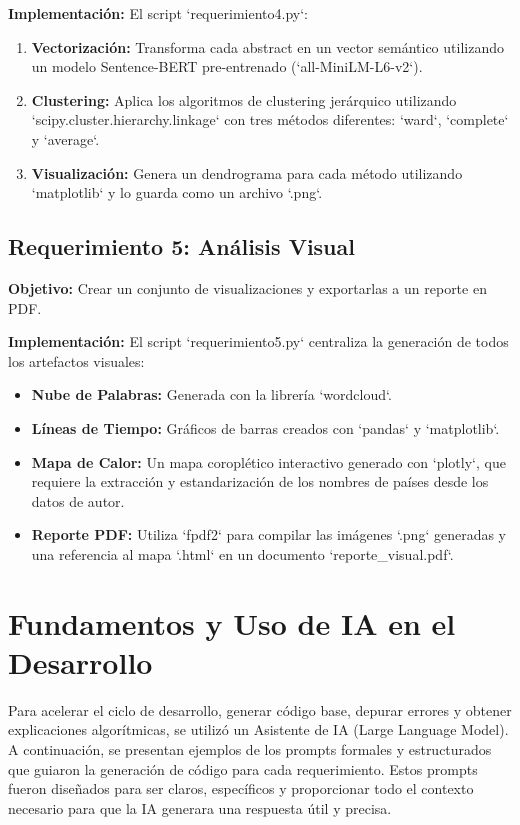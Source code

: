 \documentclass[12pt, a4paper]{article}
\begin{document}
\textbf{Implementación:} El script `requerimiento4.py`:
\begin{enumerate}
    \item \textbf{Vectorización:} Transforma cada abstract en un vector semántico utilizando un modelo Sentence-BERT pre-entrenado (`all-MiniLM-L6-v2`).
    \item \textbf{Clustering:} Aplica los algoritmos de clustering jerárquico utilizando `scipy.cluster.hierarchy.linkage` con tres métodos diferentes: `ward`, `complete` y `average`.
    \item \textbf{Visualización:} Genera un dendrograma para cada método utilizando `matplotlib` y lo guarda como un archivo `.png`.
\end{enumerate}

\subsection{Requerimiento 5: Análisis Visual}
\textbf{Objetivo:} Crear un conjunto de visualizaciones y exportarlas a un reporte en PDF.

\textbf{Implementación:} El script `requerimiento5.py` centraliza la generación de todos los artefactos visuales:
\begin{itemize}
    \item \textbf{Nube de Palabras:} Generada con la librería `wordcloud`.
    \item \textbf{Líneas de Tiempo:} Gráficos de barras creados con `pandas` y `matplotlib`.
    \item \textbf{Mapa de Calor:} Un mapa coroplético interactivo generado con `plotly`, que requiere la extracción y estandarización de los nombres de países desde los datos de autor.
    \item \textbf{Reporte PDF:} Utiliza `fpdf2` para compilar las imágenes `.png` generadas y una referencia al mapa `.html` en un documento `reporte\_visual.pdf`.
\end{itemize}

\section{Fundamentos y Uso de IA en el Desarrollo}
Para acelerar el ciclo de desarrollo, generar código base, depurar errores y obtener explicaciones algorítmicas, se utilizó un Asistente de IA (Large Language Model). A continuación, se presentan ejemplos de los prompts formales y estructurados que guiaron la generación de código para cada requerimiento. Estos prompts fueron diseñados para ser claros, específicos y proporcionar todo el contexto necesario para que la IA generara una respuesta útil y precisa.
\end{document}
